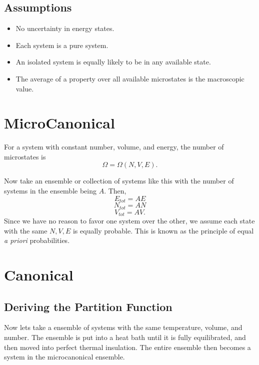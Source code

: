 
\subsection{Assumptions}

\begin{itemize}

	\item No uncertainty in energy states.

	\item Each system is a pure system.

	\item An isolated system is equally likely to be in any available state.

	\item The average of a property over all available microstates is the
		macroscopic value.

\end{itemize}

\section{MicroCanonical}\label{sec:ch2MicroCanonical}

For a system with constant number, volume, and energy, the number of microstates
is \[ \Omega = \Omega(N, V, E).\]

Now take an ensemble or collection of systems like this with the number of
systems in the ensemble being $A$. Then, \[ E_{tot} = A E
\]\[N_{tot} = A N \] \[ V_{tot} = A V.\]  Since we have no reason to favor one
system over the other, we assume each state with the same $N, V, E$ is equally
probable. This is known as the principle of equal \textit{a priori}
probabilities. 

\section{Canonical}\label{sec:Canonical}

\subsection{Deriving the Partition Function}

Now lets take a ensemble of systems with the same temperature, volume, and
number. The ensemble is put into a heat bath until it is fully equilibrated,
and then moved into perfect thermal insulation. The entire ensemble then becomes
a system in the microcanonical ensemble.

